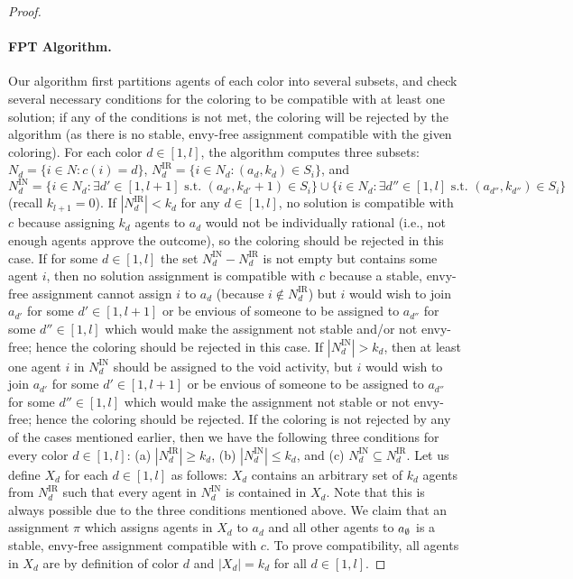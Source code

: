 \begin{proof}
	\paragraph{FPT Algorithm.}
	Our algorithm first partitions agents of each color into several subsets, and check several necessary conditions for the coloring to be compatible with at least one solution; if any of the conditions is not met, the coloring will be rejected by the algorithm (as there is no stable, envy-free assignment compatible with the given coloring). 
	For each color $d\in [1, l]$, the algorithm computes three subsets: $N_d = \{i \in N : c(i) = d\}$,
	 $N^{\text{IR}}_d = \{i \in N_d : (a_d, k_d) \in S_i \}$, and
	 $N^{\text{IN}}_d = \{i \in N_d : \exists d'\in[1, l+1] \text{~s.t.~} (a_{d'}, k_{d'}+1) \in S_i\} \cup \{i\in N_d: \exists d'' \in [1,l] \text{~s.t.~} (a_{d''}, k_{d''}) \in S_i\}$ (recall $k_{l+1} = 0$).
	If $|N^{\text{IR}}_d| < k_d$ for any $d\in [1, l]$, no solution is compatible with $c$ because assigning $k_d$ agents to $a_d$ would not be individually rational (i.e., not enough agents approve the outcome), so the coloring should be rejected in this case.
	If for some $d \in [1, l]$ the set $N^{\text{IN}}_d - N^{\text{IR}}_d$ is not empty but contains some agent $i$, then no solution assignment is compatible with $c$ because a stable, envy-free assignment cannot assign $i$ to $a_d$ (because $i\not\in N^{\text{IR}}_d$) but $i$ would wish to join $a_{d'}$ for some $d'\in [1, l+1]$ or be envious of someone to be assigned to $a_{d''}$ for some $d''\in[1, l]$ which would make the assignment not stable and/or not envy-free; hence the coloring should be rejected in this case. 
	If $|N^{\text{IN}}_d| > k_d$, then at least one agent $i$ in $N^{\text{IN}}_d$ should be assigned to the void activity, but $i$ would wish to join $a_{d'}$ for some $d'\in[1, l+1]$ or be envious of someone to be assigned to $a_{d''}$ for some $d''\in[1,l]$ which would make the assignment not stable or not envy-free; hence the coloring should be rejected.
	If the coloring is not rejected by any of the cases mentioned earlier, then we have the following three conditions for every color $d\in [1, l]$: (a) $|N^{\text{IR}}_d| \geq k_d$, (b) $|N^{\text{IN}}_d| \leq k_d$, and (c) $N^{\text{IN}}_d \subseteq N^{\text{IR}}_d$.
	Let us define $X_d$ for each $d\in [1, l]$ as follows: $X_d$ contains an arbitrary set of $k_d$ agents from $N^{\text{IR}}_d$ such that every agent in $N^{\text{IN}}_d$ is contained in $X_d$. Note that this is always possible due to the three conditions mentioned above. 
	We claim that an assignment $\pi$ which assigns agents in $X_d$ to $a_d$ and all other agents to $a_{\emptyset}$ is a stable, envy-free assignment compatible with $c$. To prove compatibility, all agents in $X_d$ are by definition of color $d$ and $|X_d| = k_d$ for all $d\in [1, l]$.

\end{proof}
